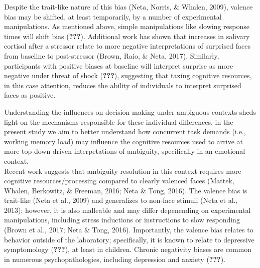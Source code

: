 \documentclass[man]{apa6}
\begin{document}
Despite the trait-like nature of this bias (Neta, Norris, \& Whalen, 2009), valence bias may be shifted, at least temporarily, by a number of experimental manipulations. As mentioned above, simple manipulations like slowing response times will shift bias ({\textbf{???}}). Additional work has shown that increases in salivary cortisol after a stressor relate to more negative interpretations of surprised faces from baseline to post-stressor (Brown, Raio, \& Neta, 2017). Similarly, participants with positive biases at baseline will interpret surprise as more negative under threat of shock ({\textbf{???}}), suggesting that taxing cognitive resources, in this case attention, reduces the ability of individuals to interpret surprised faces as positive.

Understanding the influences on decision making under ambiguous contexts sheds light on the mechanisms responsible for these individual differences. in the present study we aim to better understand how concurrent task demands (i.e., working memory load) may influence the cognitive resources used to arrive at more top-down driven interpetations of ambiguity, specifically in an emotional context.\\
Recent work suggests that ambiguity resolution in this context requires more cognitive resources/processing compared to clearly valenced faces (Mattek, Whalen, Berkowitz, \& Freeman, 2016; Neta \& Tong, 2016).
The valence bias is trait-like (Neta et al., 2009) and generalizes to non-face stimuli (Neta et al., 2013); however, it is also malleable and may differ depenending on experimental manipulations, including stress inductions or instructions to slow responding (Brown et al., 2017; Neta \& Tong, 2016). Importantly, the valence bias relates to behavior outside of the laboratory; specifically, it is known to relate to depressive symptomology ({\textbf{???}}), at least in children. Chronic negativity biases are common in numerous psychopathologies, including depression and anxiety ({\textbf{???}}).
\end{document}
